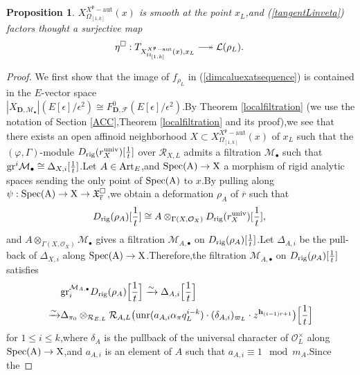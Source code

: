 \documentclass[SecEq,CM,GP]{degruyter-crelle} %
\theoremstyle{plain}
\newtheorem{pro}[thm]{Proposition}
\newcommand{\twoheadlongrightarrow}{\relbar\joinrel\twoheadrightarrow}
\newcommand{\Art}{{\rm Art}}
\newcommand{\Dpik}{{\mathbf{D}}}
\newcommand{\gr}{{\rm gr}}
\newcommand{\omepik}{\Omega_{[1,k]}}
\newcommand{\rig}{{\rm rig}}
\newcommand{\Spec}{\rm Spec}
\newcommand{\unr}{{\rm unr}}
\newcommand{\univer}{{\rm univ}}
\newcommand{\xfpx}{X^{X^\fp-\mathrm{aut}}_{\omepik}(x)}
\newcommand{\bh}{{\mathbf{h}}}
\newcommand{\cR}{\mathcal R}
\newcommand{\cM}{\mathcal M}
\newcommand{\cF}{\mathcal F}
\newcommand{\cO}{\mathcal O}
\newcommand{\fp}{{\mathfrak{p}}}
\newcommand{\sL}{\mathcal L}
\begin{document}
\begin{pro}\label{smoothnessdefvar}$\xfpx$ is smooth at the point $x_L$,\;and (\ref{tangentLinveta}) factors thought a surjective map
\begin{equation}\label{defortangentmap1eta}
	\eta^\Box:T_{\xfpx,x_L}\twoheadlongrightarrow \sL(\rho_L).\;
\end{equation}
\end{pro}
\begin{proof}We first show that the image of $f_{\rho_L}$ in (\ref{dimcaluexatsequence}) is contained in the $E$-vector space\\ $|X_{\Dpik,\cM_{\bullet}}|(E[\epsilon]/\epsilon^2)\cong F_{\Dpik,\cF}^0(E[\epsilon]/\epsilon^2)$.\;By Theorem \ref{localfiltration} (we use the notation of Section \ref{ACC},\;Theorem \ref{localfiltration} and its proof),\;we see that there  exists an open affinoid neighborhood $X\subset \xfpx$ of  $x_L$ such that the $(\varphi,\Gamma)$-module $D_{\rig}(r^{\univer}_X)[\frac{1}{t}]$ over $\cR_{X,L}$ admits a filtration $\cM_\bullet$ such that $\gr^i\cM_\bullet\cong \Delta_{X,i}[\frac{1}{t}]$.\;Let $A\in \Art_E$,\;and $\Spec(A)\rightarrow X$ a morphism of rigid analytic spaces sending the only point of $\Spec(A)$ to $x$.\;By pulling along $\psi:\Spec(A)\rightarrow X\rightarrow \mathfrak{X}_{\overline{r}}^\Box$,\;we obtain a deformation $\rho_A$ of $\overline{r}$ such that \[D_{\rig}(\rho_A)[\frac{1}{t}]\cong A\otimes_{\Gamma(X,\cO_X)}D_{\rig}(r^{\univer}_X)[\frac{1}{t}],\;\]and $A\otimes_{\Gamma(X,\cO_X)}\cM_\bullet $ gives a filtration $\cM_{A,\bullet}$ on $D_{\rig}(\rho_A)[\frac{1}{t}]$.\;Let $\Delta_{A,i}$ be the  pull-back of $\Delta_{X,i}$ along $\Spec(A)\rightarrow X$.\;Therefore,\;the filtration $\cM_{A,\bullet}$ on $D_{\rig}(\rho_A)[\frac{1}{t}]$ satisfies
\begin{equation}\label{Adefor}
	\begin{aligned}
		&\gr_i^{\cM_{A,\bullet}}D_{\rig}(\rho_{A})\Big[\frac{1}{t}\Big]\xrightarrow{\sim}\Delta_{A,i}\Big[\frac{1}{t}\Big]\\
		\xrightarrow{\sim}&\Delta_{\pi_0}\otimes_{\cR_{E,L}}\cR_{A,L}\big(\unr(a_{A,i}\alpha_\pi q_L^{i-k})\cdot({\delta}_{A,i})_{\varpi_L}\cdot z^{{\bh}_{(i-1)r+1}}\big)\Big[\frac{1}{t}\Big]
	\end{aligned}
\end{equation}
for $1\leq i\leq k$,\;where $\delta_A$ is the pullback of the universal character of  $\cO_L^\times$ along  $\Spec(A)\rightarrow X$,\;and $a_{A,i}$ is an element of $A$ such that $a_{A,i}\equiv 1\mod m_A$.\;Since the

\end{proof}
\end{document}
